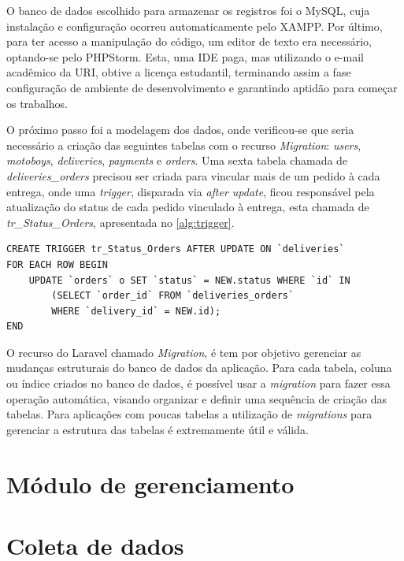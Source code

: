 O banco de dados escolhido para armazenar os registros foi o MySQL, cuja instalação e configuração ocorreu automaticamente pelo XAMPP. Por último, para ter acesso a manipulação do código, um editor de texto era necessário, optando-se pelo PHPStorm. Esta, uma IDE paga, mas utilizando o e-mail acadêmico da URI, obtive a licença estudantil, terminando assim a fase configuração de ambiente de desenvolvimento e garantindo aptidão para começar os trabalhos.

O próximo passo foi a modelagem dos dados, onde verificou-se que seria necessário a criação das seguintes tabelas com o recurso \textit{Migration}: \textit{users}, \textit{motoboys}, \textit{deliveries}, \textit{payments} e \textit{orders}. Uma sexta tabela chamada de \textit{deliveries\_orders} precisou ser criada para vincular mais de um pedido à cada entrega, onde uma \textit{trigger}, disparada via \textit{after update}, ficou responsável pela atualização do status de cada pedido vinculado à entrega, esta chamada de \textit{tr\_Status\_Orders}, apresentada no \autoref{alg:trigger}.

\begin{lstlisting}[caption={Delivery Routes - Trigger tr\_Status\_Orders}, label=alg:trigger, style=SQL]
CREATE TRIGGER tr_Status_Orders AFTER UPDATE ON `deliveries`
FOR EACH ROW BEGIN
    UPDATE `orders` o SET `status` = NEW.status WHERE `id` IN
        (SELECT `order_id` FROM `deliveries_orders`
        WHERE `delivery_id` = NEW.id); 
END
\end{lstlisting}

O recurso do Laravel chamado \textit{Migration}, é tem por objetivo gerenciar as mudanças estruturais do banco de dados da aplicação. Para cada tabela, coluna ou índice criados no banco de dados, é possível usar a \textit{migration} para fazer essa operação automática, visando organizar e definir uma sequência de criação das tabelas. Para aplicações com poucas tabelas a utilização de \textit{migrations} para gerenciar a estrutura das tabelas é extremamente útil e válida.

\section{Módulo de gerenciamento}


\section{Coleta de dados}


